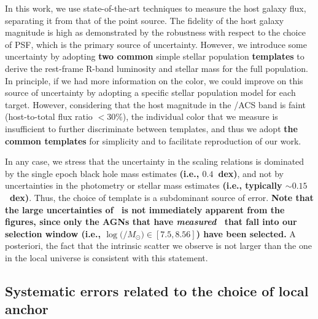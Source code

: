 \documentclass[apj]{emulateapj}
\begin{document}
In this work, we use state-of-the-art techniques to measure the host galaxy flux, separating it from that of the point source. The fidelity of the host galaxy magnitude is high as demonstrated by the robustness with respect to the choice of PSF, which is the primary source of uncertainty. However, we introduce some uncertainty by adopting {\bf two common} simple stellar population {\bf templates} to derive the rest-frame R-band luminosity and stellar mass for the full population. In principle, if we had more information on the color, we could improve on this source of uncertainty by adopting a specific stellar population model for each target. However, considering that the host magnitude in the \hst/ACS band is faint (host-to-total flux ratio $< 30\%$), the individual color that we measure is insufficient to further discriminate between templates, and thus we adopt {\bf the common templates} for simplicity and to facilitate reproduction of our work.

In any case, we stress that the uncertainty in the scaling relations is dominated by the single epoch black hole mass estimates {\bf (i.e., $0.4$~dex)}, and not by uncertainties in the photometry or stellar mass estimates {\bf (i.e., typically $\sim0.15$~dex)}. Thus, the choice of template is a subdominant source of error. {\bf Note that the large uncertainties of \mbh\ is not immediately apparent from the figures, since only the AGNs that have {\it measured} \mbh\ that fall into our selection window (i.e., $\log($\mbh$/M_{\odot})\in[7.5, 8.56]$) have been selected.} A posteriori, the fact that the intrinsic scatter we observe is not larger than the one in the local universe is consistent with this statement.

\subsection{Systematic errors related to the choice of local anchor}
\label{sec:local_sys}
\end{document}
